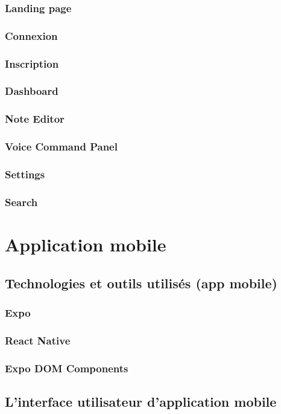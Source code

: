 \subsubsection{Landing page}
\subsubsection{Connexion}
\subsubsection{Inscription}
\subsubsection{Dashboard}
\subsubsection{Note Editor}
\subsubsection{Voice Command Panel}
\subsubsection{Settings}
\subsubsection{Search}

\section{Application mobile}
\subsection{Technologies et outils utilisés (app mobile)}
\subsubsection{Expo}
\subsubsection{React Native}
\subsubsection{Expo DOM Components}

\subsection{L'interface utilisateur d'application mobile}

